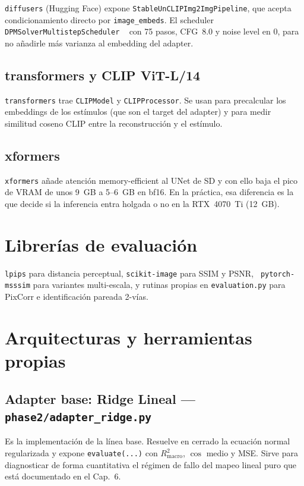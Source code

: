 \texttt{diffusers} (Hugging Face) expone \texttt{StableUnCLIPImg2ImgPipeline}, que acepta 
condicionamiento directo por \texttt{image\_embeds}. El scheduler \texttt{DPMSolverMultistepScheduler}
~\cite{lu2022dpmsolver} con 75 pasos, CFG~8.0 y noise level en 0, para no añadirle más 
varianza al embedding del adapter.

\subsection{transformers y CLIP ViT-L/14}

\texttt{transformers} trae \texttt{CLIPModel} y \texttt{CLIPProcessor}. Se usan para 
precalcular los embeddings de los estímulos (que son el target del adapter) y para medir 
similitud coseno CLIP entre la reconstrucción y el estímulo.

\subsection{xformers}

\texttt{xformers} añade atención memory-efficient al UNet de SD y con ello baja el pico de 
VRAM de unos 9~GB a 5--6~GB en bf16. En la práctica, esa diferencia es la que decide si la 
inferencia entra holgada o no en la RTX~4070~Ti (12~GB).

\section{Librerías de evaluación}

\texttt{lpips} para distancia perceptual, \texttt{scikit-image} para SSIM y PSNR, \texttt{
pytorch-msssim} para variantes multi-escala, y rutinas propias en \texttt{evaluation.py} para 
PixCorr e identificación pareada 2-vías.

\section{Arquitecturas y herramientas propias}

\subsection{Adapter base: Ridge Lineal --- \texttt{phase2/adapter\_ridge.py}}

Es la implementación de la línea base. Resuelve en cerrado la ecuación normal regularizada y 
expone \texttt{evaluate(...)} con $R^{2}_{\mathrm{macro}}$, $\cos$ medio y MSE. Sirve para 
diagnosticar de forma cuantitativa el régimen de fallo del mapeo lineal puro que está 
documentado en el Cap.~6.

